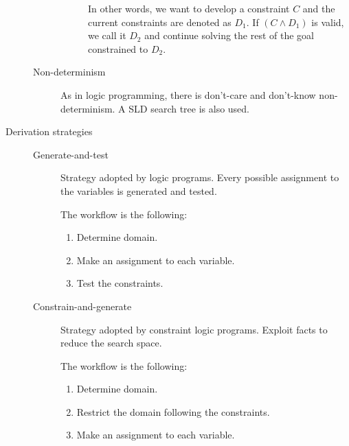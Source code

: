 \begin{description}
\begin{description}
\begin{description}
                        In other words, we want to develop a constraint $C$ and the current constraints are denoted as $D_1$.
                        If $(C \land D_1)$ is valid, we call it $D_2$ and continue solving the rest of the goal constrained to $D_2$.
                \end{description}

            \item[Non-determinism]
                As in logic programming, there is don't-care and don't-know non-determinism. 
                A SLD search tree is also used.
        \end{description} 

    \item[Derivation strategies] \phantom{}
        \begin{description}
            \item[Generate-and-test] 
                Strategy adopted by logic programs.
                Every possible assignment to the variables is generated and tested.
                
                The workflow is the following:
                \begin{enumerate}
                    \item Determine domain.
                    \item Make an assignment to each variable.
                    \item Test the constraints.
                \end{enumerate}

            \item[Constrain-and-generate] 
                Strategy adopted by constraint logic programs.
                Exploit facts to reduce the search space.

                The workflow is the following:
                \begin{enumerate}
                    \item Determine domain.
                    \item Restrict the domain following the constraints.
                    \item Make an assignment to each variable.
                \end{enumerate}
        \end{description}
\end{description}



